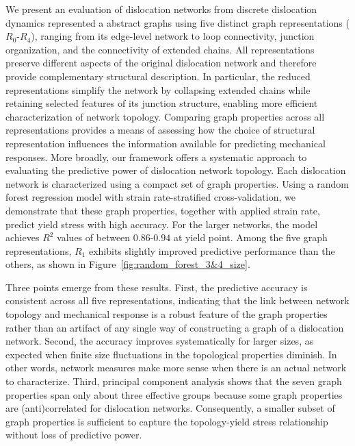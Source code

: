 \documentclass[pdflatex,sn-mathphys-num]{sn-jnl}%
\theoremstyle{thmstyleone}%
\theoremstyle{thmstyletwo}%
\theoremstyle{thmstylethree}%
\begin{document}
We present an evaluation of dislocation networks from discrete dislocation dynamics represented a abstract graphs using five distinct graph representations ($R_0$-$R_4$), ranging from its edge-level network to loop connectivity, junction organization, and the connectivity of extended chains.
All representations preserve different aspects of the original dislocation network and therefore provide complementary structural description.
In particular, the reduced representations simplify the network by collapsing extended chains while retaining selected features of its junction structure, enabling more efficient characterization of network topology.
Comparing graph properties across all representations provides a means of assessing how the choice of structural representation influences the information available for predicting mechanical responses.
More broadly, our framework offers a systematic approach to evaluating the predictive power of dislocation network topology.
Each dislocation network is characterized using a compact set of graph properties.
Using a random forest regression model with strain rate-stratified cross-validation, we demonstrate that these graph properties, together with applied strain rate, predict yield stress with high accuracy.
For the larger networks, the model achieves $R^2$ values of between $0.86$-$0.94$ at yield point.
Among the five graph representations, $R_1$ exhibits slightly improved predictive performance than the others, as shown in Figure~\ref{fig:random_forest_3&4_size}.

Three points emerge from these results.
First, the predictive accuracy is consistent across all five representations, indicating that the link between network topology and mechanical response is a robust feature of the graph properties rather than an artifact of any single way of constructing a graph of a dislocation network.
Second, the accuracy improves systematically for larger sizes, as expected when finite size fluctuations in the topological properties diminish.
In other words, network measures make more sense when there is an actual network to characterize.
Third, principal component analysis shows that the seven graph properties span only about three effective groups because some graph properties are (anti)correlated for dislocation networks.
Consequently, a smaller subset of graph properties is sufficient to capture the topology-yield stress relationship without loss of predictive power.
\end{document}
